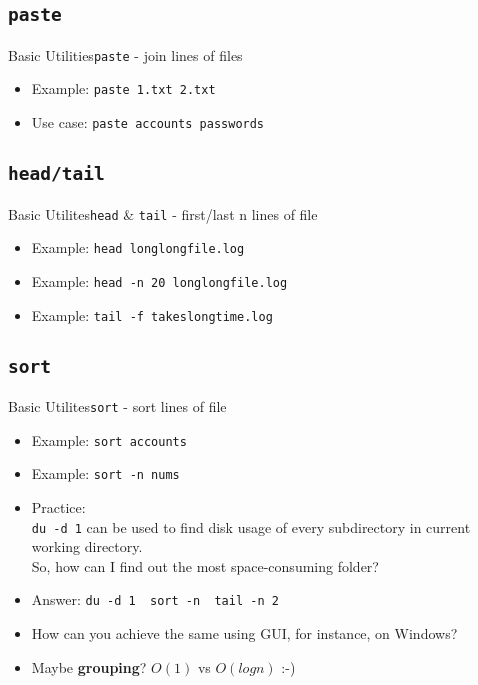 \documentclass[aspectratio=169]{beamer}
\begin{document}
\subsection{\tt paste}
\begin{frame}{Basic Utilities}{\texttt{paste} - join lines of files}

\begin{itemize}[<+->]
\item
  Example: \texttt{paste\ 1.txt\ 2.txt}
\item
  Use case: \texttt{paste\ accounts\ passwords}
\end{itemize}

\end{frame}

\subsection{\tt head/tail}
\begin{frame}{Basic Utilites}{\texttt{head} \& \texttt{tail} - first/last n lines of
file}

\begin{itemize}[<+->]
\item
  Example: \texttt{head\ longlongfile.log}
\item
  Example: \texttt{head\ -n\ 20\ longlongfile.log}
\item
  Example: \texttt{tail\ -f\ takeslongtime.log}
\end{itemize}

\end{frame}

\subsection{\tt sort}
\begin{frame}{Basic Utilites}{\texttt{sort} - sort lines of file}

\begin{itemize}[<+->]
\item
  Example: \texttt{sort\ accounts}
\item
  Example: \texttt{sort\ -n\ nums}
\item
  Practice:\\
   \texttt{du\ -d\ 1} can be used to find disk usage of every
  subdirectory in current working directory.\\
   So, how can I find out the most space-consuming folder?
\item
  Answer:
  \texttt{du\ -d\ 1\ \textbar{}\ sort\ -n\ \textbar{}\ tail\ -n\ 2}
\item
  How can you achieve the same using GUI, for instance, on Windows?
\item
  Maybe \textbf{grouping}? \(O(1)\) vs \(O(logn)\) :-)
\end{itemize}

\end{frame}
\end{document}
